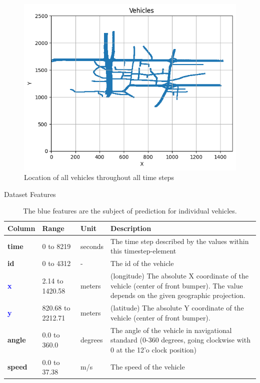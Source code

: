\documentclass[conference]{IEEEtran}
\begin{document}
{\begin{figure}
    \centering
    \includegraphics[width=0.7\linewidth]{figures/location.png}
    \caption{Location of all vehicles throughout all time steps \cite{dataset20kumbhar}}
    \label{fig:location}
\vspace{-2mm}
\end{figure}

\begin{table}
    \centering
    \scriptsize
    \caption{Dataset Features}
    \begin{tabular}{l|p{0.95cm}lp{4.6cm}}
        \textbf{Column}  &  Range & Unit & Description \cite{dataset20kumbhar} \\
        \hline
        \textbf{time} &  0 to 8219 & seconds & The time step described by the values within this timestep-element\\
        \textbf{id} & 0 to 4312 & - & The id of the vehicle\\
        \textcolor{blue}{\textbf{x}} & 2.14 to 1420.58 & meters & (longitude) The absolute X coordinate of the vehicle (center of front bumper). The value depends on the given geographic projection.\\
        \textcolor{blue}{\textbf{y}} & 820.68 to 2212.71 & meters & (latitude) The absolute Y coordinate of the vehicle (center of front bumper). \\
        \textbf{angle} & 0.0 to 360.0 & degrees & The angle of the vehicle in navigational standard (0-360 degrees, going clockwise with 0 at the 12'o clock position)\\
        \textbf{speed} & 0.0 to 37.38 & m/s & The speed of the vehicle\\
    \end{tabular}
    \label{tab:features}
    \captionsetup{singlelinecheck=false, justification=raggedright}
    \caption*{\centering \footnotesize *The blue features are the subject of prediction for individual vehicles.}
    \vspace{-5mm}
\end{table}

}
\end{document}
